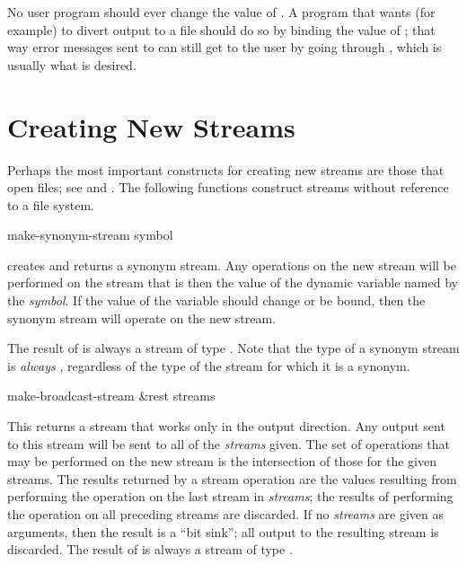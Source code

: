 No user program should ever change the value of .  A program
that wants (for example) to divert output to a file should do so by binding
the value of ; that way error messages sent to
 can still get to the user by going through ,
which is usually what is desired.

\section {Creating New Streams}

Perhaps the most important constructs for creating new streams
are those that open files; see  and .
The following functions construct streams without reference to a file system.

\begin{defun}[Function]
make-synonym-stream symbol

 creates and returns
a synonym stream.
Any operations on the new stream will be performed on the stream
that is then the value of the dynamic variable named by the \emph{symbol}.
If the value of the variable should change or be bound,
then the synonym stream will operate on the new stream.

The result of
 is always a stream of type .
Note that the type of a synonym stream is \emph{always} ,
regardless of the type of the stream for which it is a synonym.
\end{defun}

\begin{defun}[Function]
make-broadcast-stream &rest streams

This returns a stream that works only in the output direction.  Any output
sent to this stream will be sent to all of the \emph{streams} given.
The set of
operations that may be performed on the new stream is the intersection
of those for the given streams.  The results returned by a stream
operation are the values resulting from
performing the operation on the last stream in \emph{streams}; the
results of performing the operation on all preceding streams are
discarded.
If no \emph{streams} are given as arguments, then the result
is a ``bit sink''; all output to the resulting stream is discarded.
The result of
 is always a stream of type .
\end{defun}

